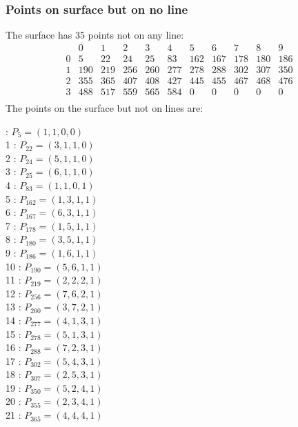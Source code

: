 \documentclass{article}
\begin{document}
{\subsubsection*{Points on surface but on no line}
The surface has 35 points not on any line:\\
$$
\begin{array}{r|*{10}{r}}
 & 0 & 1 & 2 & 3 & 4 & 5 & 6 & 7 & 8 & 9\\
\hline
0 & 5 & 22 & 24 & 25 & 83 & 162 & 167 & 178 & 180 & 186\\
1 & 190 & 219 & 256 & 260 & 277 & 278 & 288 & 302 & 307 & 350\\
2 & 355 & 365 & 407 & 408 & 427 & 445 & 455 & 467 & 468 & 476\\
3 & 488 & 517 & 559 & 565 & 584 & 0 & 0 & 0 & 0 & 0\\
\end{array}
$$
The points on the surface but not on lines are:\\
\begin{multicols}{2}
 : $P_{5}=( 1, 1, 0, 0 )$\\
1 : $P_{22}=( 3, 1, 1, 0 )$\\
2 : $P_{24}=( 5, 1, 1, 0 )$\\
3 : $P_{25}=( 6, 1, 1, 0 )$\\
4 : $P_{83}=( 1, 1, 0, 1 )$\\
5 : $P_{162}=( 1, 3, 1, 1 )$\\
6 : $P_{167}=( 6, 3, 1, 1 )$\\
7 : $P_{178}=( 1, 5, 1, 1 )$\\
8 : $P_{180}=( 3, 5, 1, 1 )$\\
9 : $P_{186}=( 1, 6, 1, 1 )$\\
10 : $P_{190}=( 5, 6, 1, 1 )$\\
11 : $P_{219}=( 2, 2, 2, 1 )$\\
12 : $P_{256}=( 7, 6, 2, 1 )$\\
13 : $P_{260}=( 3, 7, 2, 1 )$\\
14 : $P_{277}=( 4, 1, 3, 1 )$\\
15 : $P_{278}=( 5, 1, 3, 1 )$\\
16 : $P_{288}=( 7, 2, 3, 1 )$\\
17 : $P_{302}=( 5, 4, 3, 1 )$\\
18 : $P_{307}=( 2, 5, 3, 1 )$\\
19 : $P_{350}=( 5, 2, 4, 1 )$\\
20 : $P_{355}=( 2, 3, 4, 1 )$\\
21 : $P_{365}=( 4, 4, 4, 1 )$\\

\end{multicols}}
\end{document}
